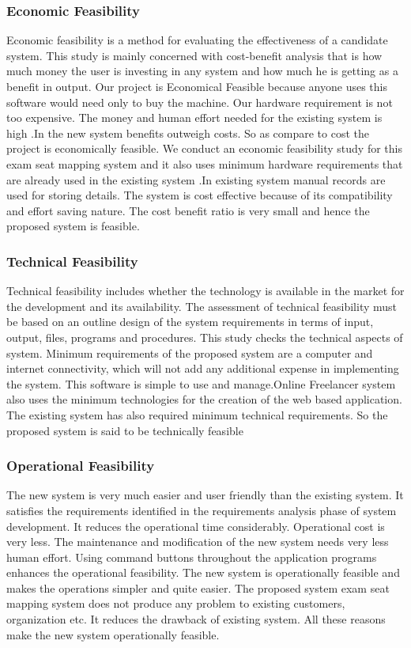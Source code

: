 \documentclass[a4paper,12pt]{article}
\begin{document}
\subsubsection{Economic Feasibility}
\hspace{5mm}
Economic feasibility is a method for evaluating the effectiveness of a candidate system. This study is mainly concerned with cost-benefit analysis that is how much money the user is investing in any system and how much he is getting as a benefit in output. Our project is Economical Feasible because anyone uses this software would need only to buy the machine. Our hardware requirement is not too expensive. The money and human effort needed for the existing system is high .In the new system benefits outweigh costs. So as compare to cost the project is economically feasible.
We conduct an economic feasibility study for this exam seat mapping system and it also uses minimum hardware requirements that are already used in the existing system .In existing system manual records are used for storing details. The system is cost effective because of its compatibility and effort saving nature. The cost benefit ratio is very small and hence the proposed system is feasible.

\newpage
\subsubsection{Technical Feasibility}
\hspace{5mm}
 Technical feasibility includes whether the technology is available in the market for the development and its availability.  The assessment of technical feasibility must be based on an outline design of the system requirements in terms of input, output, files, programs and procedures. This study checks the technical aspects of system. Minimum requirements of the proposed system are a computer and internet connectivity, which will not add any additional expense in implementing the system. This software is simple to use and manage.Online Freelancer system also uses the minimum technologies for the creation of the web based application. The existing system has also required minimum technical requirements. So the proposed system is said to be technically feasible
\subsubsection{Operational Feasibility}
\hspace{5mm}
The new system is very much easier and user friendly than the existing system. It satisfies the requirements identified in the requirements analysis phase of system development. It reduces the operational time considerably. Operational cost is very less. The maintenance and modification of the new system needs very less human effort. Using command buttons throughout the application programs enhances the operational feasibility. The new system is operationally feasible and makes the operations simpler and quite easier.
The proposed system exam seat mapping system does not produce any problem to existing customers, organization etc. It reduces the drawback of existing system. All these reasons make the new system operationally feasible.
\newpage
\end{document}
